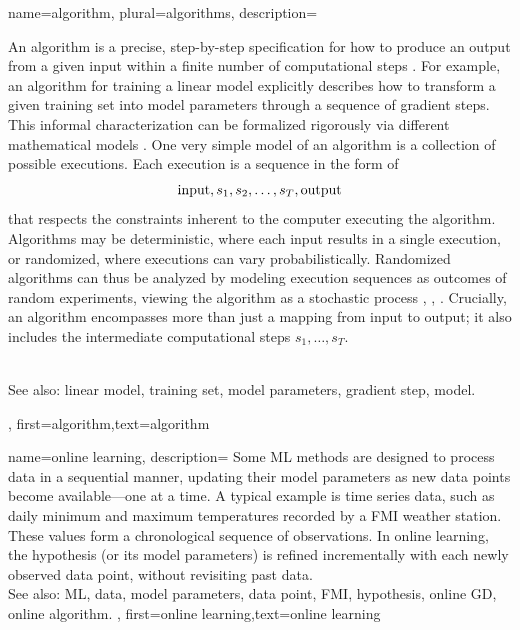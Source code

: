 {name={algorithm}, plural={algorithms},
  description={An algorithm is a precise, step-by-step specification for 
  	how to produce an output from a given input within a finite number of computational steps \cite{Cormen:2022aa}. 
    For example, an algorithm for training a linear model explicitly describes how to 
	transform a given training set into model parameters through a sequence of gradient steps. 
    This informal characterization can be formalized rigorously via different mathematical models \cite{Sipser2013}. 
    One very simple model of an algorithm is a collection of possible executions. Each execution is a sequence in the form of
    $${\rm input},s_1,s_2,\ldots,s_T,{\rm output}$$ 
    that respects the constraints inherent to the computer executing the algorithm.
	Algorithms may be deterministic, where each input results in a single execution,
	or randomized, where executions can vary probabilistically. Randomized algorithms 
	can thus be analyzed by modeling execution sequences as outcomes of random experiments, 
	viewing the algorithm as a stochastic process \cite{BertsekasProb}, \cite{RandomizedAlgos}, \cite{Gallager13}.
	Crucially, an algorithm encompasses more than just a mapping from input to output; it also includes 
	the intermediate computational steps $s_1,\ldots,s_T$. 
	
				\\ 
		See also: linear model, training set, model parameters, gradient step, model.
	},
	first={algorithm},text={algorithm} 
}

{name={online learning},
	description={
		Some ML methods  are designed to process data in a sequential 
		manner, updating their model parameters as new data points become available—one at a time. 
		A typical example is time series data, such as daily minimum and maximum temperatures 
		recorded by a FMI weather station. These values form a chronological sequence 
		of observations. In online learning, the hypothesis (or its model parameters) is refined 
		incrementally with each newly observed data point, without revisiting past data.  \\ 
		See also: ML, data, model parameters, data point, FMI, hypothesis, online GD, online algorithm. 
	},
	first={online learning},text={online learning} 
}

